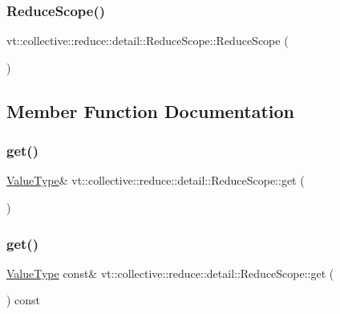 \subsubsection{\texorpdfstring{Reduce\+Scope()}{ReduceScope()}}
{\footnotesize\ttfamily vt\+::collective\+::reduce\+::detail\+::\+Reduce\+Scope\+::\+Reduce\+Scope (\begin{DoxyParamCaption}{ }\end{DoxyParamCaption})\hspace{0.3cm}{\ttfamily [default]}}



\subsection{Member Function Documentation}
\mbox{\label{structvt_1_1collective_1_1reduce_1_1detail_1_1_reduce_scope_aaceb69a568f8a644c99b4cdd0769abab}} 
\subsubsection{\texorpdfstring{get()}{get()}\hspace{0.1cm}{\footnotesize\ttfamily [1/2]}}
{\footnotesize\ttfamily \hyperlink{structvt_1_1collective_1_1reduce_1_1detail_1_1_reduce_scope_a7abcfd8ab86f38734725fe77455e4838}{Value\+Type}\& vt\+::collective\+::reduce\+::detail\+::\+Reduce\+Scope\+::get (\begin{DoxyParamCaption}{ }\end{DoxyParamCaption})\hspace{0.3cm}{\ttfamily [inline]}}

\mbox{\label{structvt_1_1collective_1_1reduce_1_1detail_1_1_reduce_scope_a8eb7250d0fc83b45fa318f91bde27045}} 
\subsubsection{\texorpdfstring{get()}{get()}\hspace{0.1cm}{\footnotesize\ttfamily [2/2]}}
{\footnotesize\ttfamily \hyperlink{structvt_1_1collective_1_1reduce_1_1detail_1_1_reduce_scope_a7abcfd8ab86f38734725fe77455e4838}{Value\+Type} const\& vt\+::collective\+::reduce\+::detail\+::\+Reduce\+Scope\+::get (\begin{DoxyParamCaption}{ }\end{DoxyParamCaption}) const\hspace{0.3cm}{\ttfamily [inline]}}

